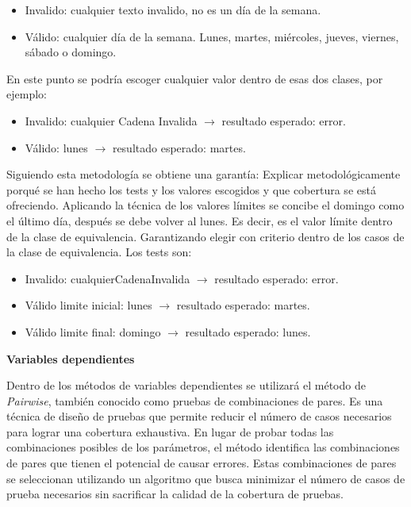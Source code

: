 \begin{itemize}
    \item Invalido: cualquier texto invalido, no es un día de la semana.
    \item Válido: cualquier día de la semana.
    Lunes, martes, miércoles, jueves, viernes, sábado o domingo.
\end{itemize}

En este punto se podría escoger cualquier valor dentro de esas dos clases, por ejemplo:

\begin{itemize}
    \item Invalido: cualquier Cadena Invalida \(\longrightarrow\) resultado esperado: error.
    \item Válido: lunes \(\longrightarrow\) resultado esperado: martes.
\end{itemize}

Siguiendo esta metodología se obtiene una garantía: Explicar metodológicamente porqué se han hecho los tests y los valores escogidos y que cobertura se está ofreciendo.
Aplicando la técnica de los valores límites se concibe el domingo como el último día, después se debe volver al lunes.
Es decir, es el valor límite dentro de la clase de equivalencia.
Garantizando elegir con criterio dentro de los casos de la clase de equivalencia.
Los tests son:

\begin{itemize}
    \item Invalido: cualquierCadenaInvalida \(\longrightarrow\) resultado esperado: error.
    \item Válido limite inicial: lunes \(\longrightarrow\) resultado esperado: martes.
    \item Válido limite final: domingo \(\longrightarrow\) resultado esperado: lunes.
\end{itemize}

\textbf{Variables dependientes}\label{variablesDependendientes}

Dentro de los métodos de variables dependientes se utilizará el método de \textit{Pairwise}, también conocido como pruebas de combinaciones de pares.
Es una técnica de diseño de pruebas que permite reducir el número de casos necesarios para lograr una cobertura exhaustiva.
En lugar de probar todas las combinaciones posibles de los parámetros, el método identifica las combinaciones de pares que tienen el potencial de causar errores.
Estas combinaciones de pares se seleccionan utilizando un algoritmo que busca minimizar el número de casos de prueba necesarios sin sacrificar la calidad de la cobertura de pruebas.


